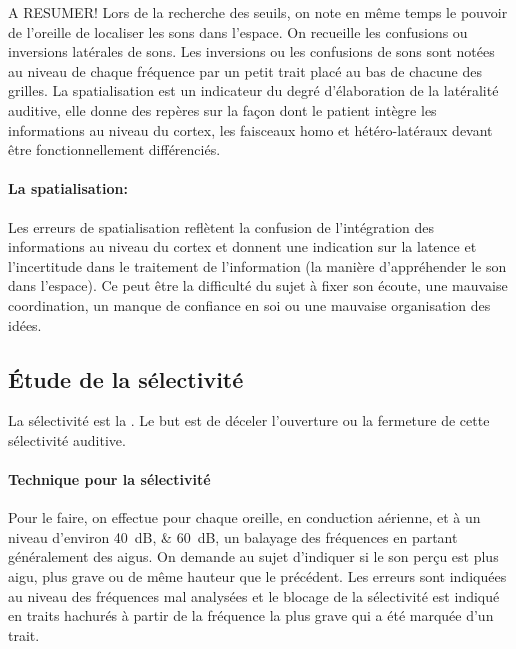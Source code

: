 A RESUMER!
Lors de la recherche des seuils, on note en même temps le pouvoir
de l'oreille de localiser les sons dans l'espace. On recueille les
confusions ou inversions latérales de sons. Les inversions ou les
confusions de sons sont notées au niveau de chaque fréquence par un
petit trait placé au bas de chacune des grilles. La spatialisation
est un indicateur du degré d'élaboration de la latéralité auditive,
elle donne des repères sur la façon dont le patient intègre les informations
au niveau du cortex, les faisceaux homo et hétéro-latéraux devant
être fonctionnellement différenciés. 

\paragraph{La spatialisation: }


Les erreurs de spatialisation reflètent la confusion
de l'intégration des informations au niveau du cortex et donnent une indication sur la latence et l'incertitude
dans le traitement de l'information (la manière d'appréhender le
son dans l'espace). Ce peut être la difficulté du sujet à fixer son
écoute, une mauvaise coordination, un manque de confiance en soi ou
une mauvaise organisation des idées.


\subsection{\'Etude de la sélectivité}

La sélectivité est la \autocite{tomatis:loreille}.
Le but est de déceler l'ouverture ou la fermeture de cette sélectivité
auditive. 


\paragraph{Technique pour la sélectivité}


Pour le faire, on effectue pour chaque oreille, en conduction
aérienne, et à un niveau d'environ \SIlist{40;60}{\dB}, un balayage des
fréquences en partant généralement des aigus. On demande au sujet
 d'indiquer si le son perçu est plus aigu, plus grave ou de même hauteur
que le précédent. Les erreurs sont indiquées au niveau des fréquences
mal analysées et le blocage de la sélectivité est indiqué en traits
hachurés à partir de la fréquence la plus grave qui a été marquée
d'un trait.

